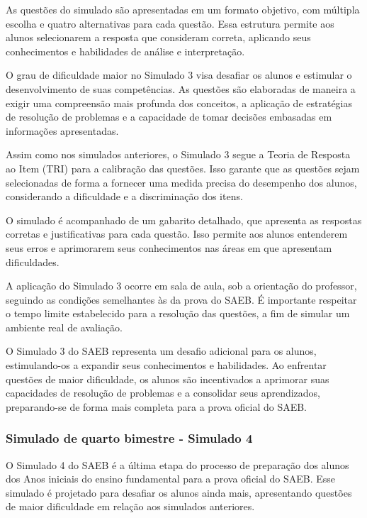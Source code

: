 As questões do simulado são apresentadas em um formato objetivo, com
múltipla escolha e quatro alternativas para cada questão. Essa estrutura
permite aos alunos selecionarem a resposta que consideram correta,
aplicando seus conhecimentos e habilidades de análise e interpretação.

O grau de dificuldade maior no Simulado 3 visa desafiar os alunos e
estimular o desenvolvimento de suas competências. As questões são
elaboradas de maneira a exigir uma compreensão mais profunda dos
conceitos, a aplicação de estratégias de resolução de problemas e a
capacidade de tomar decisões embasadas em informações apresentadas.

Assim como nos simulados anteriores, o Simulado 3 segue a Teoria de
Resposta ao Item (TRI) para a calibração das questões. Isso garante que
as questões sejam selecionadas de forma a fornecer uma medida precisa do
desempenho dos alunos, considerando a dificuldade e a discriminação dos
itens.

O simulado é acompanhado de um gabarito detalhado, que apresenta as
respostas corretas e justificativas para cada questão. Isso permite aos
alunos entenderem seus erros e aprimorarem seus conhecimentos nas áreas
em que apresentam dificuldades.

A aplicação do Simulado 3 ocorre em sala de aula, sob a orientação do
professor, seguindo as condições semelhantes às da prova do SAEB. É
importante respeitar o tempo limite estabelecido para a resolução das
questões, a fim de simular um ambiente real de avaliação.

O Simulado 3 do SAEB representa um desafio adicional para os alunos,
estimulando-os a expandir seus conhecimentos e habilidades. Ao enfrentar
questões de maior dificuldade, os alunos são incentivados a aprimorar
suas capacidades de resolução de problemas e a consolidar seus
aprendizados, preparando-se de forma mais completa para a prova oficial
do SAEB.

\subsubsection{Simulado de quarto bimestre - Simulado
4}\label{simulado-de-quarto-bimestre---simulado-4}

O Simulado 4 do SAEB é a última etapa do processo de preparação dos
alunos dos Anos iniciais do ensino fundamental para a prova oficial do
SAEB. Esse simulado é projetado para desafiar os alunos ainda mais,
apresentando questões de maior dificuldade em relação aos simulados
anteriores.

